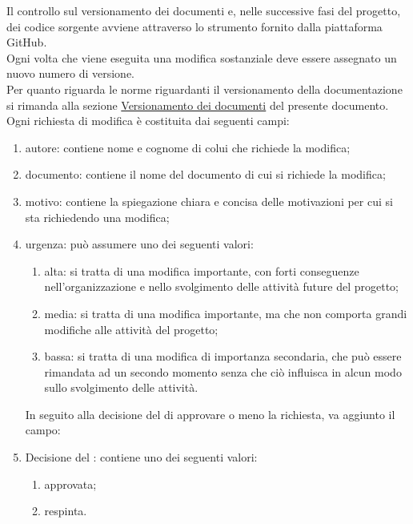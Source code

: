			Il controllo sul versionamento dei documenti e, nelle successive fasi del progetto, dei codice sorgente avviene attraverso lo strumento fornito dalla piattaforma GitHub.\\
			Ogni volta che viene eseguita una modifica sostanziale deve essere assegnato un nuovo numero di versione.\\
			Per quanto riguarda le norme riguardanti il versionamento della documentazione si rimanda alla sezione \hyperref[sec:versioni]{Versionamento dei documenti} del presente documento.
				Ogni richiesta di modifica è costituita dai seguenti campi:
				\begin{enumerate}
					\item autore: contiene nome e cognome di colui che richiede la modifica;
					\item documento: contiene il nome del documento di cui si richiede la modifica;
					\item motivo: contiene la spiegazione chiara e concisa delle motivazioni per cui si sta richiedendo una modifica;
					\item urgenza: può assumere uno dei seguenti valori:
						\begin{enumerate}
							\item alta: si tratta di una modifica importante, con forti conseguenze nell'organizzazione e nello svolgimento delle attività future del progetto;
							\item media: si tratta di una modifica importante, ma che non comporta grandi modifiche alle attività del progetto;
							\item bassa: si tratta di una modifica di importanza secondaria, che può essere rimandata ad un secondo momento senza che ciò influisca in alcun modo sullo svolgimento delle attività.
						\end{enumerate}
				In seguito alla decisione del  di approvare o meno la richiesta, va aggiunto il campo:
					\item Decisione del : contiene uno dei seguenti valori:
						\begin{enumerate}
							\item approvata;
							\item respinta.
						\end{enumerate}
				\end{enumerate}
		
